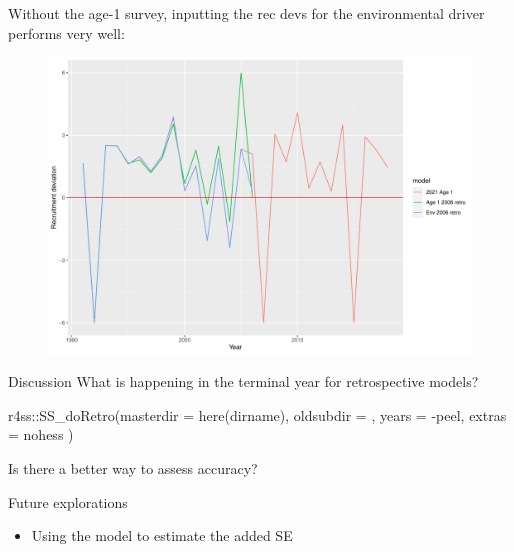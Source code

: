 \documentclass[
  ignorenonframetext,
]{beamer}
\newenvironment{Shaded}{\begin{snugshade}}{\end{snugshade}}
\newcommand{\AttributeTok}[1]{\textcolor[rgb]{0.40,0.45,0.13}{#1}}
\newcommand{\FunctionTok}[1]{\textcolor[rgb]{0.28,0.35,0.67}{#1}}
\newcommand{\NormalTok}[1]{\textcolor[rgb]{0.00,0.23,0.31}{#1}}
\newcommand{\SpecialCharTok}[1]{\textcolor[rgb]{0.37,0.37,0.37}{#1}}
\newcommand{\StringTok}[1]{\textcolor[rgb]{0.13,0.47,0.30}{#1}}
\providecommand{\tightlist}{%
  \setlength{\itemsep}{0pt}\setlength{\parskip}{0pt}}\usepackage{longtable,booktabs,array}
\begin{document}
\begin{frame}[fragile]
Without the age-1 survey, inputting the rec devs for the environmental
driver performs very well:

\begin{figure}

{\centering \includegraphics{presentation_files/figure-beamer/unnamed-chunk-6-1.pdf}

}

\end{figure}

\begin{block}{Discussion}
\protect\hypertarget{discussion}{}
What is happening in the terminal year for retrospective models?

\begin{Shaded}
\begin{Highlighting}[]
\NormalTok{r4ss}\SpecialCharTok{::}\FunctionTok{SS\_doRetro}\NormalTok{(}\AttributeTok{masterdir =} \FunctionTok{here}\NormalTok{(dirname),}
                 \AttributeTok{oldsubdir =} \StringTok{\textquotesingle{}\textquotesingle{}}\NormalTok{, }
                 \AttributeTok{years =} \SpecialCharTok{{-}}\NormalTok{peel,}
                 \AttributeTok{extras =} \StringTok{\textquotesingle{}{-}nohess\textquotesingle{}}
\NormalTok{)}
\end{Highlighting}
\end{Shaded}

Is there a better way to assess accuracy?
\end{block}

\begin{block}{Future explorations}
\protect\hypertarget{future-explorations}{}
\begin{itemize}
\tightlist
\item
  Using the model to estimate the added SE
\end{itemize}


\end{block}
\end{frame}
\end{document}
